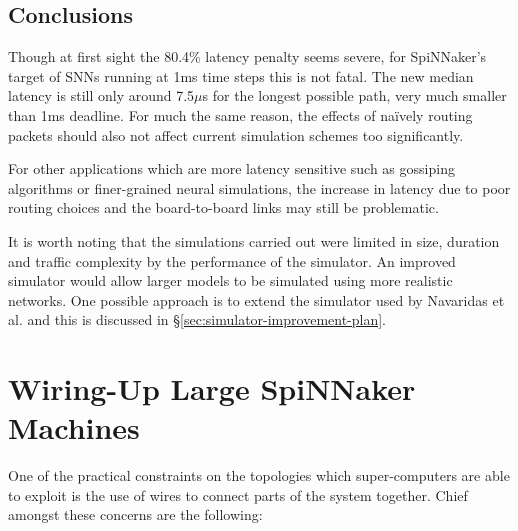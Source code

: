 		\subsection{Conclusions}
			
			Though at first sight the 80.4\% latency penalty seems severe, for
			SpiNNaker's target of SNNs running at 1ms time steps this is not fatal.
			The new median latency is still only around 7.5$\mu$s for the longest
			possible path, very much smaller than 1ms deadline.  For much the same
			reason, the effects of na\"ively routing packets should also not affect
			current simulation schemes too significantly.
			
			
			For other applications which are more latency sensitive such as gossiping
			algorithms or finer-grained neural simulations, the increase in latency
			due to poor routing choices and the board-to-board links may still be
			problematic.
			
			It is worth noting that the simulations carried out were limited in size,
			duration and traffic complexity by the performance of the simulator. An
			improved simulator would allow larger models to be simulated using more
			realistic networks. One possible approach is to extend the simulator used
			by Navaridas et al. and this is discussed in \S\ref{sec:simulator-improvement-plan}.
		
	
	\section{Wiring-Up Large SpiNNaker Machines}
		
		\label{sec:wiring-up-large-spinnaker-machines}
		
		
		One of the practical constraints on the topologies which super-computers are
		able to exploit is the use of wires to connect parts of the system together.
		Chief amongst these concerns are the following:
		
